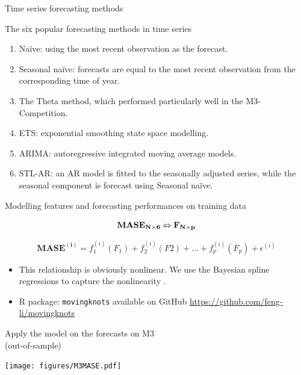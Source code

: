 \documentclass[11pt,ignorenonframetext,compress]{beamer}
\begin{document}
\begin{frame}{Time series forecasting methods}


  \begin{alertblock}{The six popular forecasting methods in time series}
    \begin{enumerate}
    \item Naïve: using the most recent observation as the forecast.
    \item Seasonal naïve: forecasts are equal to the most recent observation from the corresponding time of year.
    \item The Theta method, which performed particularly well in the M3-Competition.
    \item ETS: exponential smoothing state space modelling.
    \item ARIMA: autoregressive integrated moving average models.
    \item STL-AR: an AR model is fitted to the seasonally adjusted series, while the seasonal component is forecast using Seasonal naïve.
    \end{enumerate}
  \end{alertblock}

\end{frame}

\begin{frame}{Modelling features and forecasting performances on
    training data}

  \[\bf{MASE}_{N\times6} \Leftrightarrow \bf{F}_{N\times p}\]

  \[\mathbf{MASE^{(i)}} = f_1^{(i)}(F_1) + f_2^{(i)}(F2) + ... + f_p^{(i)}(F_p) + \epsilon^{(i)}\]
  \begin{itemize}
  \item This relationship is obviously nonlinear. We use the Bayesian spline regressions
    to capture the nonlinearity \citep{li2013efficient}.

  \item R package: {\color{blue}\texttt{movingknots}} {\footnotesize available on GitHub
      \url{https://github.com/feng-li/movingknots}}

  \end{itemize}

\end{frame}

\begin{frame}{Apply the model on the forecasts on M3 \\(out-of-sample)}

  \centerline{\texttt{[image: figures/M3MASE.pdf]}}

\end{frame}
\end{document}
